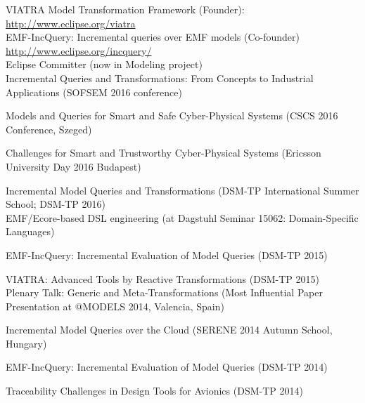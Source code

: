 \documentclass{xetexCV}
\begin{document}
VIATRA  Model Transformation Framework (Founder): \newline
\url{http://www.eclipse.org/viatra} \\

EMF-IncQuery:  Incremental queries over EMF models (Co-founder) \newline 
\url{http://www.eclipse.org/incquery/} \\


Eclipse Committer (now in Modeling project) 
\\


Incremental  Queries and Transformations: From Concepts to Industrial Applications  (SOFSEM 2016 conference) 

Models and Queries for Smart and Safe Cyber-Physical Systems (CSCS 2016 Conference, Szeged)

Challenges for Smart and Trustworthy Cyber-Physical Systems (Ericsson University Day 2016 Budapest)

Incremental Model Queries and Transformations (DSM-TP International Summer School; DSM-TP 2016) \\

EMF/Ecore-based DSL engineering  (at Dagstuhl Seminar 15062:  Domain-Specific Languages)

EMF-IncQuery: Incremental Evaluation of Model Queries (DSM-TP 2015) 

VIATRA: Advanced Tools by Reactive Transformations (DSM-TP 2015) \\

Plenary Talk: Generic and Meta-Transformations  (Most Influential Paper Presentation at @MODELS 2014, Valencia, Spain)


Incremental Model Queries over the Cloud (SERENE 2014 Autumn School, Hungary)


EMF-IncQuery: Incremental Evaluation of Model Queries (DSM-TP 2014)


Traceability Challenges in Design Tools for Avionics (DSM-TP 2014) 
\end{document}
